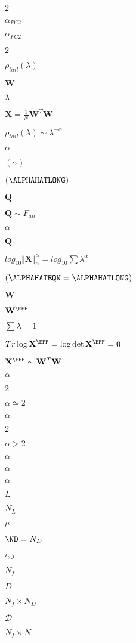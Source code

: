 $2$

$\alpha_{FC2}$

$\alpha_{FC2}$

$2$


$\rho_{tail}(\lambda)$

$\mathbf{W}$

$\lambda$

$\mathbf{X}=\tfrac{1}{N}\mathbf{W}^{T}\mathbf{W}$

$\rho_{tail}(\lambda)\sim\lambda^{-\alpha}$

$\alpha$

$(\alpha)$

$(\ALPHAHATLONG)$

$\mathbf{Q}$

$\mathbf{Q}\sim F_{an}$

$\alpha$

$\mathbf{Q}$

$log_{10}\Vert\mathbf{X}\Vert_{\alpha}^{\alpha}=log_{10}\sum\lambda^{\alpha}$

$(\ALPHAHATEQN=\ALPHAHATLONG)$

$\mathbf{W}$

$\mathbf{W}^{\EFF}$

$\sum\lambda=1$

$Tr\log\mathbf{X}^{\EFF}=\log\det\mathbf{X}^{\EFF}=0$

$\mathbf{X}^{\EFF}\sim\mathbf{W}^{T}\mathbf{W}$

$\alpha$

$2$

$\alpha\simeq 2$

$\alpha$

$2$

$\alpha > 2$

$\alpha$

$\alpha$

$\alpha$



$L$

$N_{L}$

$\mu$

$\ND=N_{D}$

$i,j$

$N_{f}$

$D$

$N_{f}\times N_{D}$

$\mathcal{D}$

$N_{f}\times N$

